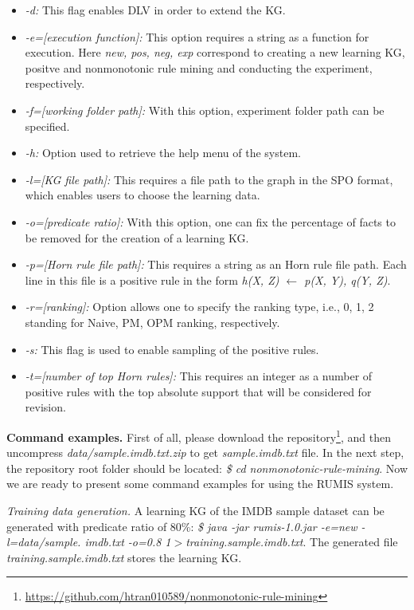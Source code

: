 \begin{itemize}
\item \textit{-d:} This flag enables DLV in order to extend the KG.
\item \textit{-e=[execution function]:} This option requires a string as a function for execution. Here \textit{new, pos, neg, exp} correspond to creating a new learning KG, positve and nonmonotonic rule mining and conducting the experiment, respectively.
\item \textit{-f=[working folder path]:} With this option, experiment folder path can be specified.
\item \textit{-h:} Option used to retrieve the help menu of the system.
\item \textit{-l=[KG file path]:} This requires a file path to the graph in the SPO format, which enables users to choose the learning data.
\item \textit{-o=[predicate ratio]:} With this option, one can fix the percentage of facts to be removed for the creation of a learning KG.
\item \textit{-p=[Horn rule file path]:} This requires a string as an Horn rule file path. Each line in this file is a positive rule in the form \textit{h(X, Z) $\leftarrow$ p(X, Y), q(Y, Z)}.
\item \textit{-r=[ranking]:} Option allows one to specify the ranking type, i.e., 0, 1, 2 standing for Naive, PM, OPM ranking, respectively.
\item \textit{-s:} This flag is used to enable sampling of the positive rules.
\item \textit{-t=[number of top Horn rules]:} This requires an integer as a number of positive rules with the top absolute support that will be considered for revision.
\end{itemize}

\textbf{Command examples.} First of all, please download the repository\footnote{\url{https://github.com/htran010589/nonmonotonic-rule-mining}}, and then uncompress \textit{data/sample.imdb.txt.zip} to get \textit{sample.imdb.txt} file. In the next step, the repository root folder should be located: \textit{\$ cd nonmonotonic-rule-mining}. Now we are ready to present some command examples for using the RUMIS system.

\textit{Training data generation.} A learning KG of the IMDB sample dataset can be generated with predicate ratio of 80\%: \textit{\$ java -jar rumis-1.0.jar -e=new -l=data/sample. imdb.txt -o=0.8 1$>$training.sample.imdb.txt}. The generated file \textit{training.sample.imdb.txt} stores the learning KG.

